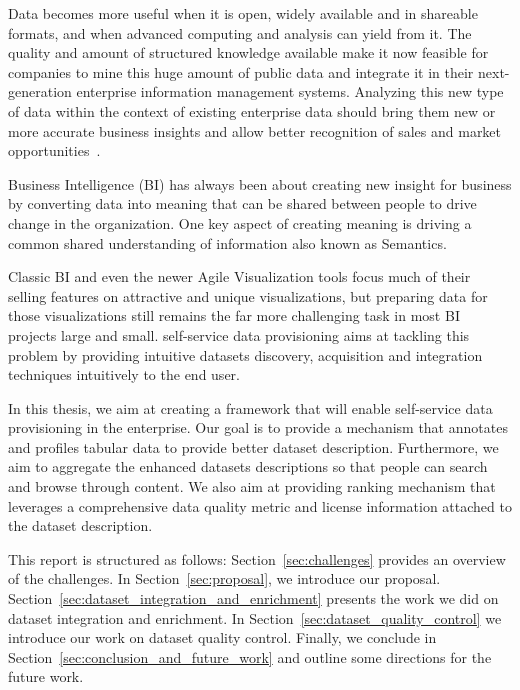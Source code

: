 \documentclass[onecolumn, crcready]{../../Util/LaTEX/iosart2c}
\begin{document}
Data becomes more useful when it is open, widely available and in shareable formats, and when advanced computing and analysis can yield from it. The quality and amount of structured knowledge available make it now feasible for companies to mine this huge amount of public data and integrate it in their next-generation enterprise information management systems. Analyzing this new type of data within the context of existing enterprise data should bring them new or more accurate business insights and allow better recognition of sales and market opportunities~\cite{LaValle:MIT:11}.

Business Intelligence (BI) has always been about creating new insight for business by converting data into meaning that can be shared between people to drive change in the organization. One key aspect of creating meaning is driving a common shared understanding of information also known as Semantics.

Classic BI and even the newer Agile Visualization tools focus much of their selling features on attractive and unique visualizations, but preparing data for those visualizations still remains the far more challenging task in most BI projects large and small. self-service data provisioning aims at tackling this problem by providing intuitive datasets discovery, acquisition and integration techniques intuitively to the end user.

In this thesis, we aim at creating a framework that will enable self-service data provisioning in the enterprise. Our goal is to provide a mechanism that annotates and profiles tabular data to provide better dataset description. Furthermore, we aim to aggregate the enhanced datasets descriptions so that people can search and browse through content. We also aim at providing ranking mechanism that leverages a comprehensive data quality metric and license information attached to the dataset description.

This report is structured as follows: Section~\ref{sec:challenges} provides an overview of the challenges. In Section~\ref{sec:proposal}, we introduce our proposal. Section~\ref{sec:dataset_integration_and_enrichment} presents the work we did on dataset integration and enrichment. In Section~\ref{sec:dataset_quality_control} we introduce our work on dataset quality control. Finally, we conclude in Section~\ref{sec:conclusion_and_future_work} and outline some directions for the future work.

\end{document}
